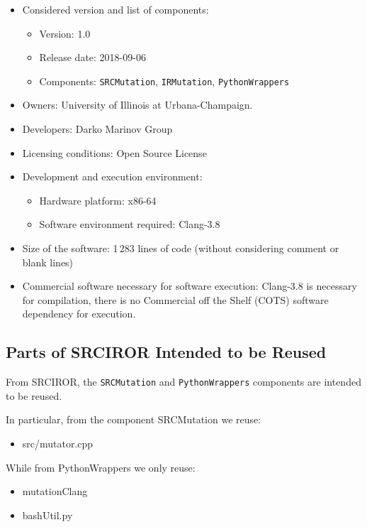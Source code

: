 \begin{itemize}
	\item Considered version and list of components:
	\begin{itemize}
		\item Version: 1.0
		\item Release date: 2018-09-06
		\item Components: \texttt{SRCMutation}, \texttt{IRMutation}, \texttt{PythonWrappers}
	\end{itemize}
	\item Owners: University of Illinois at Urbana-Champaign.
	\item Developers: Darko Marinov Group
	\item Licensing conditions: Open Source License
	\item Development and execution environment:
	\begin{itemize}
		\item Hardware platform: x86-64
		\item Software environment required: Clang-3.8
	\end{itemize}
	\item Size of the software: 1\,283 lines of code (without considering comment or blank lines)
	\item Commercial software necessary for software execution: Clang-3.8 is necessary for compilation, there is no Commercial off the Shelf (COTS) software dependency for execution.
\end{itemize}

\subsection{Parts of SRCIROR Intended to be Reused}


From SRCIROR, the \texttt{SRCMutation} and \texttt{PythonWrappers} components are intended to be reused.

In particular, from the component SRCMutation we reuse:
\begin{itemize}
	\item src/mutator.cpp
\end{itemize}

While from PythonWrappers we only reuse:

\begin{itemize}
	\item mutationClang
	\item bashUtil.py
\end{itemize}

